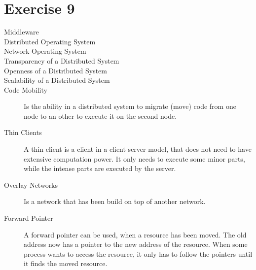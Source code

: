 \documentclass{article}
\begin{document}
	\section*{Exercise 9}
	\begin{description}
		\item[Middleware]

		\item[Distributed Operating System]

		\item[Network Operating System]

		\item[Transparency of a Distributed System]

		\item[Openness of a Distributed System]

		\item[Scalability of a Distributed System]

		\item[Code Mobility] Is the ability in a distributed system to migrate (move) code from one node to an other to execute it on the second node. 
		
		\item[Thin Clients] A thin client is a client in a client server model, that does not need to have extensive computation power. It only needs to execute some minor parts, while the intense parts are executed by the server. 

		\item[Overlay Networks] Is a network that has been build on top of another network. 
		
		\item[Forward Pointer] A forward pointer can be used, when a resource has been moved. The old address now has a pointer to the new address of the resource. When some process wants to access the resource, it only has to follow the pointers until it finds the moved resource. 

	\end{description}

 
\end{document}
